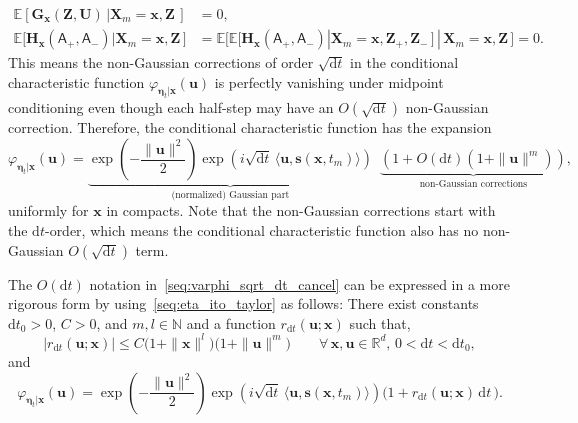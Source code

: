\documentclass[
 longbibliography,
 twocolumn,
 superscriptaddress,
 amsmath,
 amssymb,
 amsthm,
 amsfonts,
 prl,
 floatfix,
]{revtex4-2}
\newcommand{\matbf}[1]{\boldsymbol{\mathsf{#1}}}
\begin{document}
\begin{widetext}
\begin{equation*}
    \begin{aligned}
    \mathbb{E}[
    \bm{G}_{\bm{x}}(\bm{Z},\bm{U})\,|\bm{X}_m=\bm{x},\bm{Z}\,]
    &=0,
    \\
    \mathbb{E}\big[
    \bm{H}_{\bm{x}}(\matbf{A}_+,\matbf{A}_-)|\bm{X}_m=\bm{x},\bm{Z}\,\big]
    &=\mathbb{E}\big[\mathbb{E}[
    \bm{H}_{\bm{x}}(\matbf{A}_+,\matbf{A}_-)|\bm{X}_m=\bm{x},\bm{Z}_+,\bm{Z}_-\,]
    \,|\,\bm{X}_m=\bm{x},\bm{Z}\,\big]
    =0.
    \end{aligned}
\end{equation*}
This means the non-Gaussian corrections of order $\sqrt{\mathrm{d}t}$ in the conditional characteristic function $\varphi_{\bm\eta_t|\bm{x}}(\bm{u})$ is perfectly vanishing under midpoint conditioning even though each half-step may have an $O(\sqrt{\mathrm dt})$ non-Gaussian correction. 
Therefore, the conditional characteristic function has the expansion
\begin{equation}
    \varphi_{\bm\eta_t|\bm{x}}(\bm{u})
    =\underbrace{\exp\left(-\frac{\|\bm{u}\|^2}{2} \right)
    \exp\left(i\sqrt{\mathrm{d}t}\,\langle\bm{u},\bm{s}(\bm{x},t_m) \rangle\right)}_{\text{(normalized) Gaussian part}}
    \,\,\,\underbrace{\left(1+O(\mathrm{d}t)(1+\|\bm{u}\|^m)\right)}_{\text{non-Gaussian corrections}},
    \label{seq:varphi_sqrt_dt_cancel}
\end{equation}
uniformly for $\bm{x}$ in compacts. Note that the non-Gaussian corrections start with the $\mathrm dt$-order, which means the conditional characteristic function also has no non-Gaussian $O(\sqrt{\mathrm dt})$ term.

The $O(\mathrm dt)$ notation in~\eqref{seq:varphi_sqrt_dt_cancel} can be expressed in a more rigorous form by using~\eqref{seq:eta_ito_taylor} as follows:
There exist constants $\mathrm{d}t_0>0$, $C>0$, and $m,l\in\mathbb N$
and a function $r_{\mathrm dt}(\bm u;\bm x)$ such that,
\begin{equation}
    | r_{\mathrm dt}(\bm u;\bm x) |
    \le C \big(1+\|\bm x\|^l\big)\big(1+\|\bm u\|^m\big)
    \qquad
    \forall\,\bm x,\bm u\in\mathbb R^d,\,
    0<\mathrm dt<\mathrm dt_0,
    \label{seq:r_dt_bound}
\end{equation}
and
\begin{equation}
    \varphi_{\bm\eta_t|\bm x}(\bm u)
    =\exp\left(-\frac{\|\bm u\|^2}{2} \right)
    \exp\left(
    i\sqrt{\mathrm dt}\,\langle \bm u, \bm s(\bm x,t_m)\rangle
    \right)
    \big(1+r_{\mathrm dt}(\bm u;\bm x)\,\mathrm dt\,\big).
    \label{seq:varphi_expansion_remainder}
\end{equation}


\end{widetext}
\end{document}
